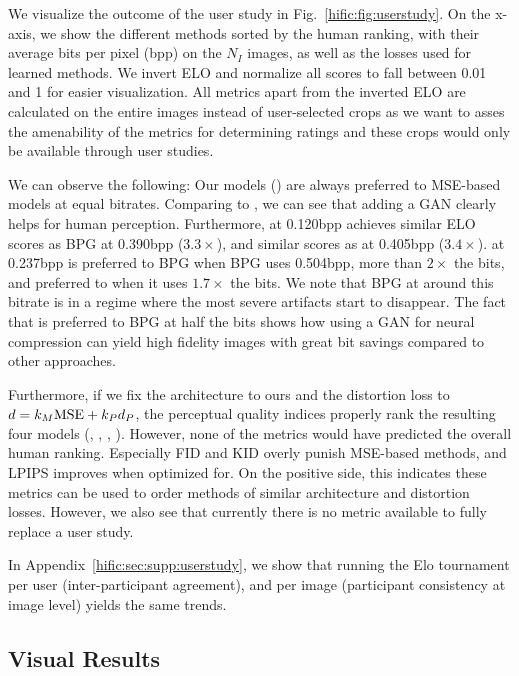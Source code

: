 We visualize the outcome of the user study in Fig.~\ref{hific:fig:userstudy}.
On the x-axis, we show the different methods sorted by the human ranking, with their average bits per pixel (bpp) on the $N_I$ images, as well as the losses used for learned methods.
We invert ELO and normalize all scores to fall between 0.01 and 1 for easier visualization.
All metrics apart from the inverted ELO are calculated on the entire images instead of user-selected crops as we want to asses the amenability of the metrics for determining ratings and these crops  would only be available through user studies.

We can observe the following: 
Our models (\name) are always preferred to MSE-based models at equal bitrates.
Comparing \enamelo to \eblmselpips, we can see that adding a GAN clearly helps for human perception.
Furthermore, \enamelo at 0.120bpp achieves similar ELO scores as BPG at 0.390bpp ($3.3{\times}$), and similar scores as \eblminnen at 0.405bpp ($3.4{\times}$). 
\enamemi at 0.237bpp is preferred to BPG when BPG uses 0.504bpp, more than $2{\times}$ the bits, and preferred to \eblminnen when it uses $1.7{\times}$ the bits. 
We note that BPG at around this bitrate is in a regime where the most severe artifacts start to disappear.
The fact that \enamemi is preferred to BPG at half the bits shows how using a GAN for neural compression can yield high fidelity images with great bit savings compared to other approaches.




Furthermore, if we fix the architecture to ours and the distortion loss to $d=k_M \text{MSE} + k_P d_P$, the perceptual quality indices properly rank the resulting four models (\enamelo, \enamemi, \enamehi, \eblmselpips).
However, none of the metrics would have predicted the overall human ranking. Especially FID and KID overly punish MSE-based methods, and LPIPS improves when optimized for.
On the positive side, this indicates these metrics can be used to order methods of similar architecture and distortion losses. However, we also see that currently there is no metric available to fully replace a user study.

In Appendix~\ref{hific:sec:supp:userstudy}, we show that running the Elo tournament per user (inter-participant agreement), and per image (participant consistency at image level) yields the same trends. 

\subsection{Visual Results} \label{hific:sec:visuals}
